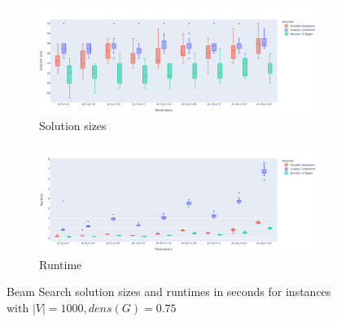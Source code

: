 \documentclass[draft,final]{vutinfth} %
\begin{document}
\begin{figure}
    \centering
    \begin{subfigure}{\textwidth}
        \centering
        \includegraphics[width=\textwidth]{graphics/lbh-075-1000-size.pdf}
        \caption{Solution sizes}
    \end{subfigure}
    \begin{subfigure}{\textwidth}
        \centering
        \includegraphics[width=\textwidth]{graphics/lbh-075-1000-runtime.pdf}
        \caption{Runtime}
    \end{subfigure}
    \caption{Beam Search solution sizes and runtimes in seconds for instances with $|V|=1000, dens(G)=0.75$}
    \label{fig:bs-heuristics-random-3}
\end{figure}
\end{document}
